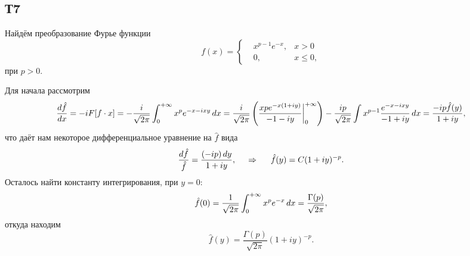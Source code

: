 \subsection{Т7}

Найдём преобразование Фурье функции
\begin{equation*}
    f(x) = \left\{\begin{aligned}
        &x^{p-1} e^{-x}, &x>0 \\
        &0, &x \leq 0,
    \end{aligned}\right.
\end{equation*}
при $p > 0$. 

Для начала рассмотрим
\begin{align*}
    \frac{d \hat{f}}{d x} 
    =
     -i F[f \cdot x] = - \frac{i}{\sqrt{2\pi}} \int_0^{+\infty} x^p e^{-x - ixy} \, d x 
     = 
    \frac{i}{\sqrt{2\pi}} \left(
        \frac{x p e^{-x(1+iy)}}{-1-iy} \bigg|_0^{+\infty}
    \right) - \frac{ip}{\sqrt{2\pi}} \int x^{p-1} \frac{e^{-x - i xy}}{-1 + i y} \, d x 
    =
    \frac{-i p \hat{f}(y)}{1 + iy} ,
\end{align*}
что даёт нам некоторое дифференциальное уравнение на $\hat{f}$ вида
\begin{equation*}
    \frac{d \hat{f}}{ \hat{f}} = \frac{(-ip) \, d y}{1 + iy},
    \hspace{0.5cm} \Rightarrow \hspace{0.5cm}
    \hat{f}(y) = C (1 + iy)^{-p}.
\end{equation*}
Осталось найти константу интегрирования, при $y=0$:
\begin{equation*}
    \hat{f}(0) = \frac{1}{\sqrt{2\pi}} \int_0^{+\infty} x^p e^{-x} \, d x = \frac{\Gamma(p)}{\sqrt{2\pi}},
\end{equation*}
откуда находим
\begin{equation*}
    \hat{f}(y) = \frac{\Gamma(p)}{\sqrt{2\pi}} (1+iy)^{-p}.
\end{equation*}


